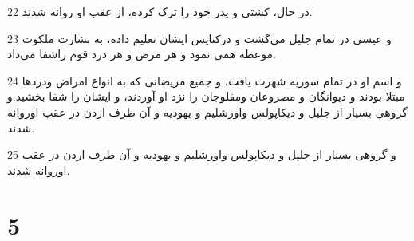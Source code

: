 \par 22 در حال، کشتی و پدر خود را ترک کرده، از عقب او روانه شدند.
\par 23 و عیسی در تمام جلیل می‌گشت و درکنایس ایشان تعلیم داده، به بشارت ملکوت موعظه همی نمود و هر مرض و هر درد قوم راشفا می‌داد.
\par 24 و اسم او در تمام سوریه شهرت یافت، و جمیع مریضانی که به انواع امراض ودردها مبتلا بودند و دیوانگان و مصروعان ومفلوجان را نزد او آوردند، و ایشان را شفا بخشید.و گروهی بسیار از جلیل و دیکاپولس واورشلیم و یهودیه و آن طرف اردن در عقب اوروانه شدند.
\par 25 و گروهی بسیار از جلیل و دیکاپولس واورشلیم و یهودیه و آن طرف اردن در عقب اوروانه شدند.

\chapter{5}

